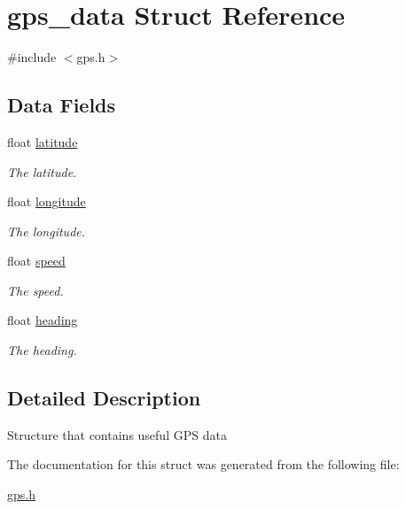 \hypertarget{structgps__data}{}\section{gps\+\_\+data Struct Reference}
\label{structgps__data}


{\ttfamily \#include $<$gps.\+h$>$}

\subsection*{Data Fields}
\begin{DoxyCompactItemize}
\item 
float \hyperlink{structgps__data_ad9e643bc6bd5a62b9b5011cf1c93629e}{latitude}\hypertarget{structgps__data_ad9e643bc6bd5a62b9b5011cf1c93629e}{}\label{structgps__data_ad9e643bc6bd5a62b9b5011cf1c93629e}

\begin{DoxyCompactList}\small\item\em The latitude. \end{DoxyCompactList}\item 
float \hyperlink{structgps__data_a006303577d6adb772761727538b74f80}{longitude}\hypertarget{structgps__data_a006303577d6adb772761727538b74f80}{}\label{structgps__data_a006303577d6adb772761727538b74f80}

\begin{DoxyCompactList}\small\item\em The longitude. \end{DoxyCompactList}\item 
float \hyperlink{structgps__data_a7f7e4724cf57d59513b39c5ecc81adc8}{speed}\hypertarget{structgps__data_a7f7e4724cf57d59513b39c5ecc81adc8}{}\label{structgps__data_a7f7e4724cf57d59513b39c5ecc81adc8}

\begin{DoxyCompactList}\small\item\em The speed. \end{DoxyCompactList}\item 
float \hyperlink{structgps__data_ac5682e48513a771560df50e3b213e61a}{heading}\hypertarget{structgps__data_ac5682e48513a771560df50e3b213e61a}{}\label{structgps__data_ac5682e48513a771560df50e3b213e61a}

\begin{DoxyCompactList}\small\item\em The heading. \end{DoxyCompactList}\end{DoxyCompactItemize}


\subsection{Detailed Description}
Structure that contains useful G\+PS data 

The documentation for this struct was generated from the following file\+:\begin{DoxyCompactItemize}
\item 
\hyperlink{gps_8h}{gps.\+h}\end{DoxyCompactItemize}
